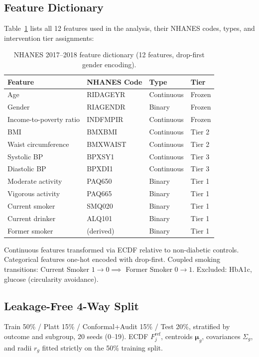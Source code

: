 \documentclass[11pt,a4paper]{article}
\theoremstyle{plain}
\begin{document}
\subsection{Feature Dictionary}

Table~\ref{tab:feature_dict} lists all 12 features used in the analysis, their NHANES codes, types, and intervention tier assignments:

\begin{table}[htbp]
\centering
\caption{NHANES 2017--2018 feature dictionary (12 features, drop-first gender encoding).}
\label{tab:feature_dict}
\begin{tabular}{llll}
\toprule
Feature & NHANES Code & Type & Tier \\
\midrule
Age & RIDAGEYR & Continuous & Frozen \\
Gender & RIAGENDR & Binary & Frozen \\
Income-to-poverty ratio & INDFMPIR & Continuous & Frozen \\
BMI & BMXBMI & Continuous & Tier 2 \\
Waist circumference & BMXWAIST & Continuous & Tier 2 \\
Systolic BP & BPXSY1 & Continuous & Tier 3 \\
Diastolic BP & BPXDI1 & Continuous & Tier 3 \\
Moderate activity & PAQ650 & Binary & Tier 1 \\
Vigorous activity & PAQ665 & Binary & Tier 1 \\
Current smoker & SMQ020 & Binary & Tier 1 \\
Current drinker & ALQ101 & Binary & Tier 1 \\
Former smoker & (derived) & Binary & Tier 1 \\
\bottomrule
\end{tabular}
\end{table}

Continuous features transformed via ECDF relative to non-diabetic controls. Categorical features one-hot encoded with drop-first. Coupled smoking transitions: Current Smoker $1\to 0 \implies$ Former Smoker $0\to 1$. Excluded: HbA1c, glucose (circularity avoidance).

\subsection{Leakage-Free 4-Way Split}

Train 50\% / Platt 15\% / Conformal+Audit 15\% / Test 20\%, stratified by outcome and subgroup, 20 seeds (0--19). ECDF $F_j^{\text{ref}}$, centroids $\boldsymbol\mu_g$, covariances $\Sigma_g$, and radii $r_g$ fitted strictly on the 50\% training split.
\end{document}
